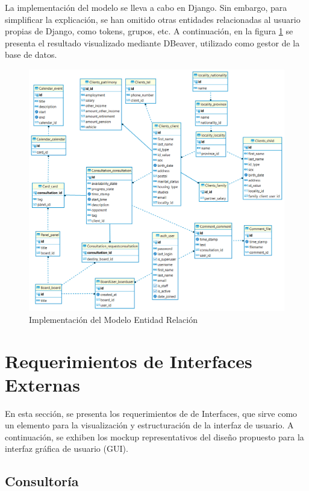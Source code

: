 \newpage

La implementación del modelo se lleva a cabo en Django. Sin embargo, para simplificar la explicación, se han omitido otras entidades relacionadas al usuario propias de Django, como tokens, grupos, etc. A continuación, en la  figura \ref{fig:dbeaver} se presenta el resultado visualizado mediante DBeaver, utilizado como gestor de la base de datos.

\begin{figure}[H]
    \centering
    \includegraphics[width=1\linewidth]{fig/dbeaver.png}
    \caption{Implementación del Modelo Entidad Relación}
    \label{fig:dbeaver}
\end{figure}




\section{Requerimientos de Interfaces Externas}


En esta sección, se presenta los requerimientos de de Interfaces, que sirve como un elemento para la visualización y estructuración de la interfaz de usuario. A continuación, se exhiben los mockup representativos del diseño propuesto para la interfaz gráfica de usuario (GUI).

\subsection{Consultoría}

